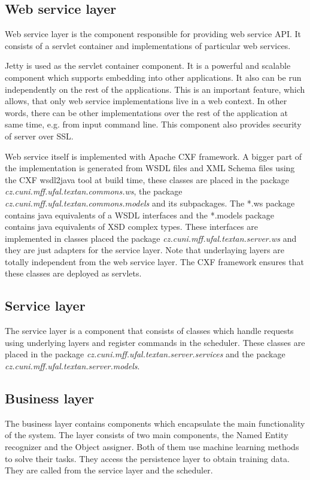 \subsection{Web service layer}
Web service layer is the component responsible for providing web service
API. It consists of a servlet container and implementations of particular
web services.

Jetty is used as the servlet container component. It is a powerful and scalable
component which supports embedding into other applications. It also can be run independently
on the rest of the applications. This is an important feature, which allows, that only
web service implementations live in a web context. %
In other words, there can be
other implementations over the rest of the application at same time, e.g. from input
command line. This component also provides security of \textan{} server over SSL.

Web service itself is implemented with Apache CXF framework. A bigger part of
the implementation is generated from WSDL files and XML Schema files using the
CXF wsdl2java tool at build time, these classes are placed in the package %
\emph{cz.\-cuni.\-mff.\-ufal.\-textan.\-commons.\-ws}, the package
\emph{cz.\-cuni.\-mff.\-ufal.\-textan.\-commons.\-models} and its subpackages. %
The *.ws package contains java equivalents of a WSDL interfaces and the *.models
package contains java equivalents of XSD complex types. These interfaces are
implemented in classes placed the package \emph{cz.\-cuni.\-mff.\-ufal.\-textan.\-server.\-ws}
and they are just adapters for the service layer. Note that underlaying layers are
totally independent from the web service layer. The CXF framework ensures that
these classes are deployed as servlets.

\subsection{Service layer}
The service layer is a component that consists of classes which handle requests
using underlying layers and register commands in the scheduler. These classes are
placed in the package \emph{cz.\-cuni.\-mff.\-ufal.\-textan.\-server.\-services}
and the package \emph{cz.\-cuni.\-mff.\-ufal.\-textan.\-server.\-models}.


\subsection{Business layer}
The business layer contains components which encapsulate the main functionality
of the system. The layer consists of two main components, the Named Entity
recognizer and the Object assigner. Both of them use machine learning methods to solve
their tasks. They access the persistence layer to obtain training data. They
are called from the service layer and the scheduler.

